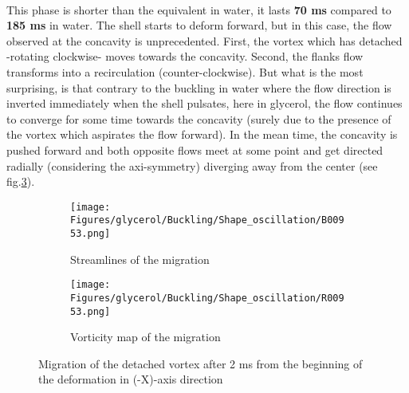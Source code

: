 \documentclass[a4paper,10pt]{report}
\begin{document}
\paragraph{}
This phase is shorter than the equivalent in water, it lasts \textbf{70 ms} compared to \textbf{185 ms} in water.
The shell starts to deform forward, but in this case, the flow observed at the concavity is unprecedented.
First, the vortex which has detached -rotating clockwise- moves towards the concavity. Second, the flanks flow transforms into a recirculation (counter-clockwise). But what is the most surprising, is that contrary to the buckling in water where the flow direction is inverted immediately when the shell pulsates, here in glycerol, the flow continues to converge for some time towards the concavity (surely due to the presence of the vortex which aspirates the flow forward). In the mean time, the concavity is pushed forward and both opposite flows meet at some point and get directed radially (considering the axi-symmetry) diverging away from the center (see fig.\ref{fig:migrationVortex}).
\begin{figure}[htbp]%
	\centering%
		\begin{subfigure}[h]{0.5\textwidth}%
					\texttt{[image: Figures/glycerol/Buckling/Shape\_oscillation/B00953.png]}%
					\caption{Streamlines of the migration}%
					\label{fig:migrationVortexstream}%
			\end{subfigure}%
			\begin{subfigure}[h]{0.5\linewidth}%
					\texttt{[image: Figures/glycerol/Buckling/Shape\_oscillation/R00953.png]}%
					\caption{Vorticity map of the migration}%
					\label{fig:migrationVortexvorticity}%
			\end{subfigure}%
		\caption{Migration of the detached vortex after 2 ms from the beginning of the deformation in (-X)-axis direction}
		\label{fig:migrationVortex}%
\end{figure}
\end{document}
